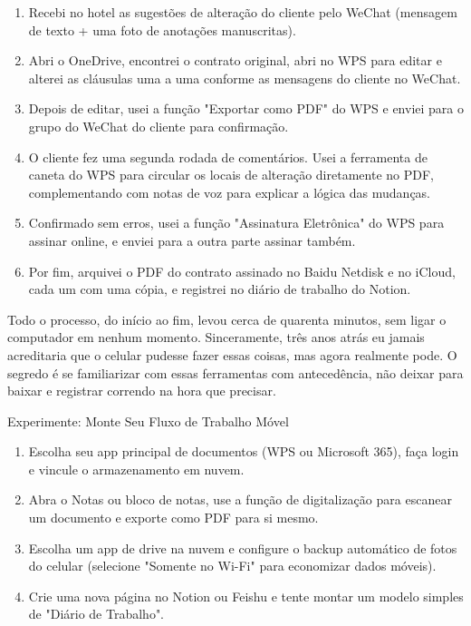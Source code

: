 \begin{enumerate}
  \item Recebi no hotel as sugestões de alteração do cliente pelo WeChat (mensagem de texto + uma foto de anotações manuscritas).
  \item Abri o OneDrive, encontrei o contrato original, abri no WPS para editar e alterei as cláusulas uma a uma conforme as mensagens do cliente no WeChat.
  \item Depois de editar, usei a função "Exportar como PDF" do WPS e enviei para o grupo do WeChat do cliente para confirmação.
  \item O cliente fez uma segunda rodada de comentários. Usei a ferramenta de caneta do WPS para circular os locais de alteração diretamente no PDF, complementando com notas de voz para explicar a lógica das mudanças.
  \item Confirmado sem erros, usei a função "Assinatura Eletrônica" do WPS para assinar online, e enviei para a outra parte assinar também.
  \item Por fim, arquivei o PDF do contrato assinado no Baidu Netdisk e no iCloud, cada um com uma cópia, e registrei no diário de trabalho do Notion.
\end{enumerate}

Todo o processo, do início ao fim, levou cerca de quarenta minutos, sem ligar o computador em nenhum momento. Sinceramente, três anos atrás eu jamais acreditaria que o celular pudesse fazer essas coisas, mas agora realmente pode. O segredo é se familiarizar com essas ferramentas com antecedência, não deixar para baixar e registrar correndo na hora que precisar.

\begin{tcbpractice}{Experimente: Monte Seu Fluxo de Trabalho Móvel}
\begin{enumerate}
  \item Escolha seu app principal de documentos (WPS ou Microsoft 365), faça login e vincule o armazenamento em nuvem.
  \item Abra o Notas ou bloco de notas, use a função de digitalização para escanear um documento e exporte como PDF para si mesmo.
  \item Escolha um app de drive na nuvem e configure o backup automático de fotos do celular (selecione "Somente no Wi-Fi" para economizar dados móveis).
  \item Crie uma nova página no Notion ou Feishu e tente montar um modelo simples de "Diário de Trabalho".
\end{enumerate}

\end{tcbpractice}
